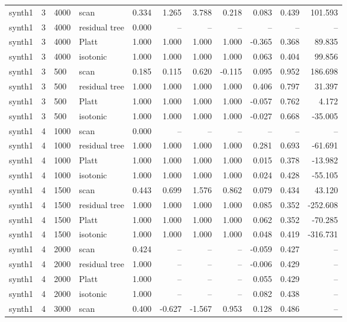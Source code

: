 \begin{tabular}{lrllrrrrrrr}
synth1 & 3 & 4000 & scan & 0.334 & 1.265 & 3.788 & 0.218 & 0.083 & 0.439 & 101.593 \\
synth1 & 3 & 4000 & residual tree & 0.000 & -- & -- & -- & -- & -- & -- \\
synth1 & 3 & 4000 & Platt & 1.000 & 1.000 & 1.000 & 1.000 & -0.365 & 0.368 & 89.835 \\
synth1 & 3 & 4000 & isotonic & 1.000 & 1.000 & 1.000 & 1.000 & 0.063 & 0.404 & 99.856 \\
synth1 & 3 & 500 & scan & 0.185 & 0.115 & 0.620 & -0.115 & 0.095 & 0.952 & 186.698 \\
synth1 & 3 & 500 & residual tree & 1.000 & 1.000 & 1.000 & 1.000 & 0.406 & 0.797 & 31.397 \\
synth1 & 3 & 500 & Platt & 1.000 & 1.000 & 1.000 & 1.000 & -0.057 & 0.762 & 4.172 \\
synth1 & 3 & 500 & isotonic & 1.000 & 1.000 & 1.000 & 1.000 & -0.027 & 0.668 & -35.005 \\
synth1 & 4 & 1000 & scan & 0.000 & -- & -- & -- & -- & -- & -- \\
synth1 & 4 & 1000 & residual tree & 1.000 & 1.000 & 1.000 & 1.000 & 0.281 & 0.693 & -61.691 \\
synth1 & 4 & 1000 & Platt & 1.000 & 1.000 & 1.000 & 1.000 & 0.015 & 0.378 & -13.982 \\
synth1 & 4 & 1000 & isotonic & 1.000 & 1.000 & 1.000 & 1.000 & 0.024 & 0.428 & -55.105 \\
synth1 & 4 & 1500 & scan & 0.443 & 0.699 & 1.576 & 0.862 & 0.079 & 0.434 & 43.120 \\
synth1 & 4 & 1500 & residual tree & 1.000 & 1.000 & 1.000 & 1.000 & 0.085 & 0.352 & -252.608 \\
synth1 & 4 & 1500 & Platt & 1.000 & 1.000 & 1.000 & 1.000 & 0.062 & 0.352 & -70.285 \\
synth1 & 4 & 1500 & isotonic & 1.000 & 1.000 & 1.000 & 1.000 & 0.048 & 0.419 & -316.731 \\
synth1 & 4 & 2000 & scan & 0.424 & -- & -- & -- & -0.059 & 0.427 & -- \\
synth1 & 4 & 2000 & residual tree & 1.000 & -- & -- & -- & -0.006 & 0.429 & -- \\
synth1 & 4 & 2000 & Platt & 1.000 & -- & -- & -- & 0.055 & 0.429 & -- \\
synth1 & 4 & 2000 & isotonic & 1.000 & -- & -- & -- & 0.082 & 0.438 & -- \\
synth1 & 4 & 3000 & scan & 0.400 & -0.627 & -1.567 & 0.953 & 0.128 & 0.486 & -- \\

\end{tabular}
